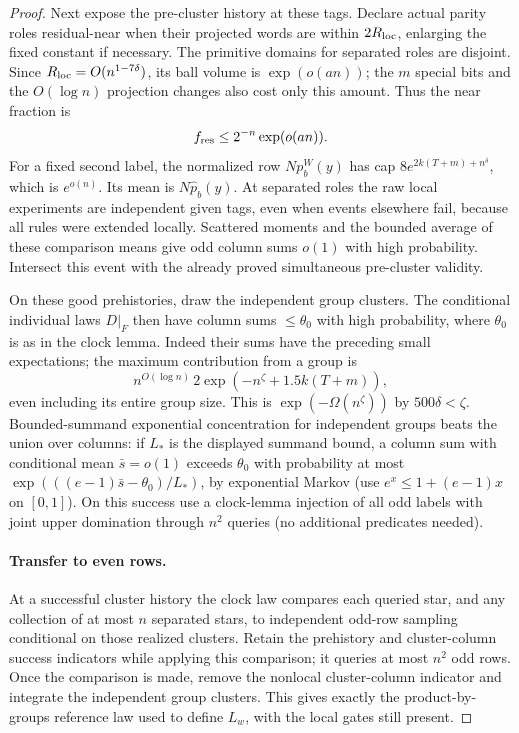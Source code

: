 \begin{proof}
Next expose the pre-cluster history at these tags. Declare actual parity roles residual-near when their projected words are within \(2R_{\rm loc}\), enlarging the fixed constant if necessary. The primitive domains for separated roles are disjoint. Since \(R_{\rm loc}=O(n^{1-7\delta})\), its ball volume is \(\exp(o(an))\); the \(m\) special bits and the \(O(\log n)\) projection changes also cost only this amount. Thus the near fraction is
\[
 f_{\rm res}\le2^{-n}\exp(o(an)).
\]
For a fixed second label, the normalized row \(Np_b^W(y)\) has cap \(8e^{2k(T+m)+n^\delta}\), which is \(e^{o(n)}\). Its mean is \(N\widehat p_b(y)\). At separated roles the raw local experiments are independent given tags, even when events elsewhere fail, because all rules were extended locally. Scattered moments and the bounded average of these comparison means give odd column sums \(o(1)\) with high probability. Intersect this event with the already proved simultaneous pre-cluster validity.

On these good prehistories, draw the independent group clusters. The conditional individual laws \(D|_F\) then have column sums \(\le\theta_0\) with high probability, where \(\theta_0\) is as in the clock lemma. Indeed their sums have the preceding small expectations; the maximum contribution from a group is
\[
 n^{O(\log n)}\,2\exp(-n^\zeta+1.5k(T+m)),
\]
even including its entire group size. This is \(\exp(-\Omega(n^\zeta))\) by \(500\delta<\zeta\). Bounded-summand exponential concentration for independent groups beats the union over columns: if \(L_*\) is the displayed summand bound, a column sum with conditional mean \(\bar s=o(1)\) exceeds \(\theta_0\) with probability at most \(\exp(((e-1)\bar s-\theta_0)/L_*)\), by exponential Markov (use \(e^x\le1+(e-1)x\) on \([0,1]\)). On this success use a clock-lemma injection of all odd labels with joint upper domination through \(n^2\) queries (no additional predicates needed).

\paragraph{Transfer to even rows.}
At a successful cluster history the clock law compares each queried star, and any collection of at most \(n\) separated stars, to independent odd-row sampling conditional on those realized clusters. Retain the prehistory and cluster-column success indicators while applying this comparison; it queries at most \(n^2\) odd rows. Once the comparison is made, remove the nonlocal cluster-column indicator and integrate the independent group clusters. This gives exactly the product-by-groups reference law used to define \(L_w\), with the local gates still present.


\end{proof}
